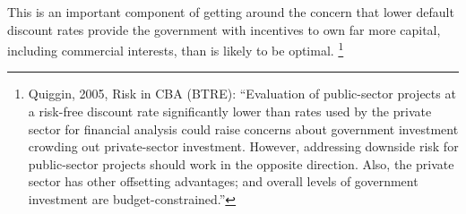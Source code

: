 This is an important component of getting around the concern that lower default discount rates provide the government with incentives to own far more capital, including commercial interests, than is likely to be optimal.%
    \footnote{Quiggin, 2005, Risk in CBA (BTRE): ``Evaluation of public-sector projects at a risk-free discount rate significantly lower than rates used by the private sector for financial analysis could raise concerns about government investment crowding out private-sector investment. However, addressing downside risk for public-sector projects should work in the opposite direction. Also, the private sector has other offsetting advantages; and overall levels of government investment are budget-constrained.''}

